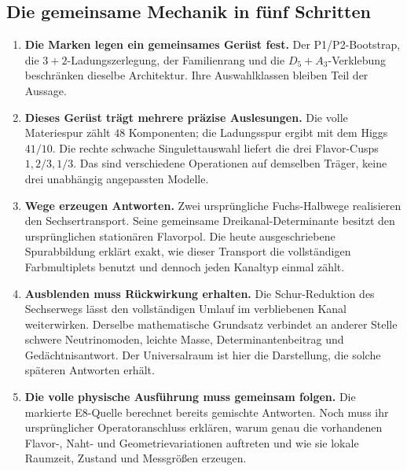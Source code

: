 \subsection{Die gemeinsame Mechanik in fünf Schritten}
\begin{enumerate}
\item \textbf{Die Marken legen ein gemeinsames Gerüst fest.} Der P1/P2-Bootstrap, die $3+2$-Ladungszerlegung, der Familienrang und die $D_5+A_3$-Verklebung beschränken dieselbe Architektur. Ihre Auswahlklassen bleiben Teil der Aussage.
\item \textbf{Dieses Gerüst trägt mehrere präzise Auslesungen.} Die volle Materiespur zählt $48$ Komponenten; die Ladungsspur ergibt mit dem Higgs $41/10$. Die rechte schwache Singulettauswahl liefert die drei Flavor-Cusps $1,2/3,1/3$. Das sind verschiedene Operationen auf demselben Träger, keine drei unabhängig angepassten Modelle.
\item \textbf{Wege erzeugen Antworten.} Zwei ursprüngliche Fuchs-Halbwege realisieren den Sechsertransport. Seine gemeinsame Dreikanal-Determinante besitzt den ursprünglichen stationären Flavorpol. Die heute ausgeschriebene Spurabbildung erklärt exakt, wie dieser Transport die vollständigen Farbmultiplets benutzt und dennoch jeden Kanaltyp einmal zählt.
\item \textbf{Ausblenden muss Rückwirkung erhalten.} Die Schur-Reduktion des Sechserwegs lässt den vollständigen Umlauf im verbliebenen Kanal weiterwirken. Derselbe mathematische Grundsatz verbindet an anderer Stelle schwere Neutrinomoden, leichte Masse, Determinantenbeitrag und Gedächtnisantwort. Der Universalraum ist hier die Darstellung, die solche späteren Antworten erhält.
\item \textbf{Die volle physische Ausführung muss gemeinsam folgen.} Die markierte E8-Quelle berechnet bereits gemischte Antworten. Noch muss ihr ursprünglicher Operatoranschluss erklären, warum genau die vorhandenen Flavor-, Naht- und Geometrievariationen auftreten und wie sie lokale Raumzeit, Zustand und Messgrößen erzeugen.
\end{enumerate}


